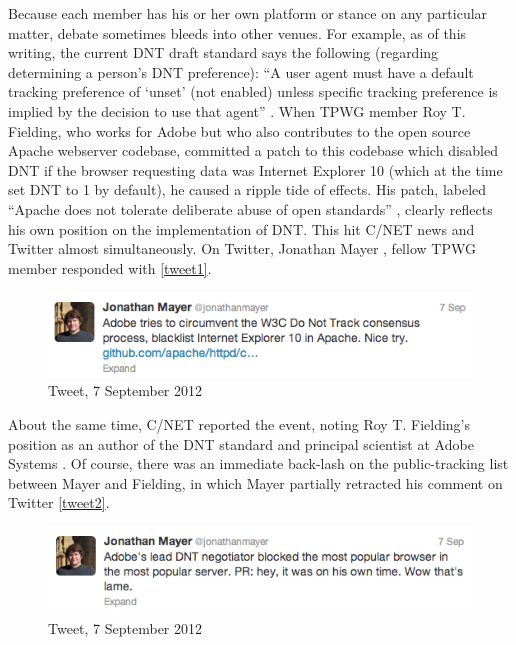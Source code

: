 Because each member has his or her own platform or stance on any particular matter, debate sometimes bleeds into other venues. For example, as of this writing, the current DNT draft standard says the following (regarding determining a person's DNT preference): ``A user agent must have a default tracking preference of `unset' (not enabled) unless specific tracking preference is implied by the decision to use that agent''  \citep{Anonymous:uk}.  When TPWG member Roy T. Fielding, who works for Adobe but who also contributes to the open source Apache webserver codebase, committed a patch to this codebase which disabled DNT if the browser requesting data was Internet Explorer 10 (which at the time set DNT to 1 by default), he caused a ripple tide of effects. His patch, labeled ``Apache does not tolerate deliberate abuse of open standards''  \citep{Fielding:2012wh},  clearly reflects his own position on the implementation of DNT. This hit C\slash NET news and Twitter almost simultaneously. On Twitter, Jonathan Mayer  \citep{J:2012uz},  fellow TPWG member responded with  \autoref{tweet1}. 

\begin{figure}
\centerline{
\includegraphics{chapter2.tex/Image5}
}
\caption{{Tweet, 7 September 2012}}
\label{tweet1}
\end{figure}


About the same time, C\slash NET reported the event, noting Roy T. Fielding's position as an author of the DNT standard and principal scientist at Adobe Systems  \citep{Shankland:tz}.  Of course, there was an immediate back-lash on the public-tracking list between Mayer and Fielding, in which Mayer  \citep{J:2012vq}  partially retracted his comment on Twitter  \autoref{tweet2}. 


\begin{figure}
\centerline{
\includegraphics{chapter2.tex/Image6}
}
\caption{{Tweet, 7 September 2012}}
\label{tweet2}
\end{figure}


